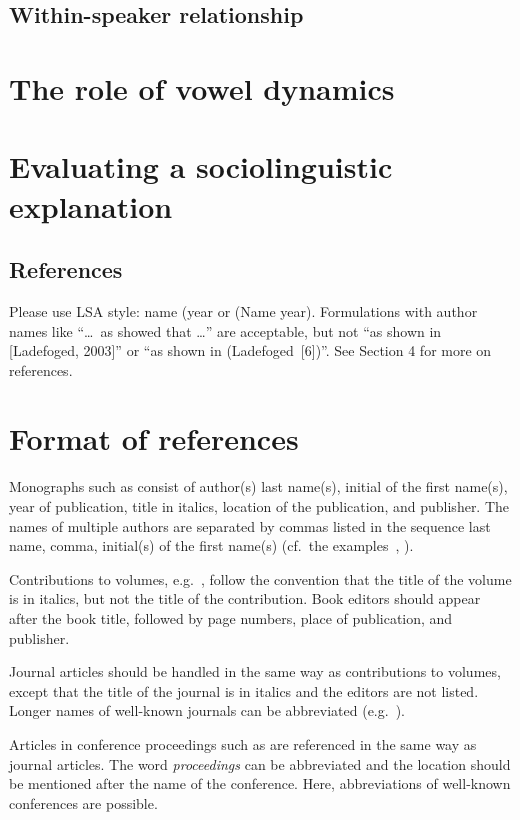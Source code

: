 \documentclass[12pt]{article}
\begin{document}
\subsection{Within-speaker relationship}

\section{The role of vowel dynamics}
\section{Evaluating a sociolinguistic explanation}


\subsection{References}

Please use LSA style: name (year or (Name year). Formulations
with author names like ``\ldots\ as 
showed that \ldots'' are acceptable, but not ``as shown in [Ladefoged,
2003]'' or ``as shown in (Ladefoged~[6])''. See Section 4 for more on references.


\section{Format of references}

Monographs such as  consist of author(s) last name(s),
initial of the first name(s), year of publication, title in italics, location of the publication, and publisher. The names of multiple authors are separated by commas listed in the 
sequence last name, comma, initial(s) of the first name(s) (cf.\ the examples~, ). 

Contributions to volumes, e.g.~, follow the
convention that the title of the volume is in italics, but not the
title of the contribution. Book editors should appear after the book title, 
followed by page numbers, place of publication, and publisher.

Journal articles should be handled in the same way as contributions to
volumes, except that the title of the journal is in italics and
the editors are not listed. Longer names of well-known journals can be
abbreviated (e.g.~).

Articles in conference proceedings such as  are
referenced in the same way as journal articles.  The word
\textit{proceedings} can be abbreviated and the location should be
mentioned after the name of the conference. Here, abbreviations of
well-known conferences are possible.



\end{document}
